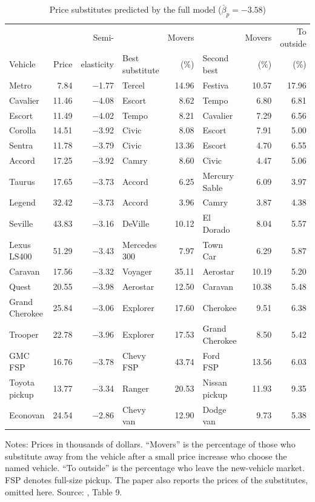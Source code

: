 \begin{table}[htbp]
\centering
\caption{Price substitutes predicted by the full model ($\bar\beta_p = -3.58$)}
\label{tab:08-blp04-price}
\scriptsize
\setlength{\tabcolsep}{3pt}
\begin{tabular}{@{}lrrlrlrr@{}}
\toprule
 & & Semi- & & Movers & & Movers & To outside \\
Vehicle & Price & elasticity & Best substitute & (\%) & Second best & (\%) & (\%) \\
\midrule
Metro & 7.84 & $-$1.77 & Tercel & 14.96 & Festiva & 10.57 & 17.96 \\
Cavalier & 11.46 & $-$4.08 & Escort & 8.62 & Tempo & 6.80 & 6.81 \\
Escort & 11.49 & $-$4.02 & Tempo & 8.21 & Cavalier & 7.29 & 6.56 \\
Corolla & 14.51 & $-$3.92 & Civic & 8.08 & Escort & 7.91 & 5.00 \\
Sentra & 11.78 & $-$3.79 & Civic & 13.36 & Escort & 4.70 & 6.55 \\
Accord & 17.25 & $-$3.92 & Camry & 8.60 & Civic & 4.47 & 5.06 \\
Taurus & 17.65 & $-$3.73 & Accord & 6.25 & Mercury Sable & 6.09 & 3.97 \\
Legend & 32.42 & $-$3.73 & Accord & 3.96 & Camry & 3.87 & 4.38 \\
Seville & 43.83 & $-$3.16 & DeVille & 10.12 & El Dorado & 8.04 & 5.57 \\
Lexus LS400 & 51.29 & $-$3.43 & Mercedes 300 & 7.97 & Town Car & 6.29 & 5.87 \\
Caravan & 17.56 & $-$3.32 & Voyager & 35.11 & Aerostar & 10.19 & 5.20 \\
Quest & 20.55 & $-$3.98 & Aerostar & 12.50 & Caravan & 10.38 & 5.48 \\
Grand Cherokee & 25.84 & $-$3.06 & Explorer & 17.60 & Cherokee & 9.51 & 6.38 \\
Trooper & 22.78 & $-$3.96 & Explorer & 17.53 & Grand Cherokee & 8.50 & 5.42 \\
GMC FSP & 16.76 & $-$3.78 & Chevy FSP & 43.74 & Ford FSP & 13.56 & 6.03 \\
Toyota pickup & 13.77 & $-$3.34 & Ranger & 20.53 & Nissan pickup & 11.93 & 9.35 \\
Econovan & 24.54 & $-$2.86 & Chevy van & 12.90 & Dodge van & 9.73 & 5.38 \\
\bottomrule
\end{tabular}

\smallskip
\begin{minipage}{0.97\linewidth}
\footnotesize Notes: Prices in thousands of dollars. ``Movers'' is the percentage of those who substitute away
from the vehicle after a small price increase who choose the named vehicle. ``To outside'' is the percentage who
leave the new-vehicle market. FSP denotes full-size pickup. The paper also reports the prices of the
substitutes, omitted here. Source:
\citet{BerryLevinsohnPakes2004}, Table 9.
\end{minipage}
\end{table}

